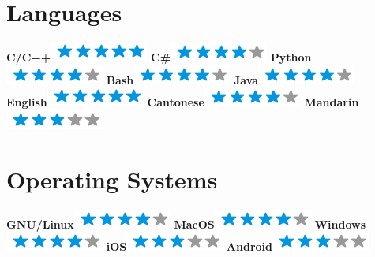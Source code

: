 \documentclass[]{friggeri-cv}
\begin{document}
\begin{aside}
  \section{Languages}
    \textbf{C/C++}\includegraphics[scale=0.40]{img/5stars.png}
    \textbf{C\#}\includegraphics[scale=0.40]{img/4stars.png}
    \textbf{Python}\includegraphics[scale=0.40]{img/4stars.png}
    \textbf{Bash}\includegraphics[scale=0.40]{img/4stars.png}
    \textbf{Java}\includegraphics[scale=0.40]{img/4stars.png}
    ~
    \textbf{English}\includegraphics[scale=0.40]{img/5stars.png}
    \textbf{Cantonese}\includegraphics[scale=0.40]{img/4stars.png}
    \textbf{Mandarin}\includegraphics[scale=0.40]{img/3stars.png}
    ~
  \section{Operating Systems}
    \textbf{GNU/Linux}\includegraphics[scale=0.40]{img/4stars.png}
    \textbf{MacOS}\includegraphics[scale=0.40]{img/4stars.png}
    \textbf{Windows}\includegraphics[scale=0.40]{img/4stars.png}
    \textbf{iOS}\includegraphics[scale=0.40]{img/3stars.png}
    \textbf{Android}\includegraphics[scale=0.40]{img/3stars.png}
    ~

\end{aside}
\end{document}
